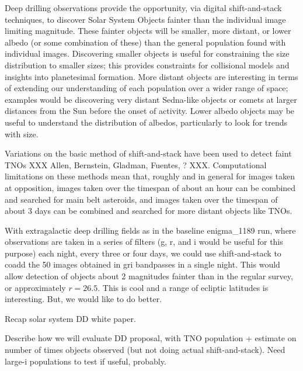 Deep drilling observations provide the opportunity, via digital
shift-and-stack techniques, to discover Solar System Objects fainter
than the individual image limiting magnitude. These fainter objects
will be smaller, more distant, or lower albedo (or some combination of these)
than the general population found with individual images. Discovering smaller
objects is useful for constraining the size distribution to smaller
sizes; this provides constraints for collisional models and insights
into planetesimal formation. More distant objects are interesting in
terms of extending our understanding of each population over a wider
range of space; examples would be discovering very distant
Sedna-like objects or comets at larger distances from the Sun before
the onset of activity. Lower albedo objects may be useful to
understand the distribution of albedos, particularly to look for
trends with size.

Variations on the basic method of shift-and-stack have been used to
detect faint TNOs XXX Allen, Bernstein, Gladman, Fuentes, ?
XXX. Computational limitations on these methods mean that, roughly
and in general for images taken at opposition, images taken over the timespan of about an hour can be
combined and searched for main belt asteroids, and images taken over
the timespan of about 3 days can be combined and searched for more
distant objects like TNOs.

With extragalactic deep drilling fields as in the baseline enigma\_1189
run, where observations are taken in a series of filters (g, r, and i
would be useful for this purpose) each night, every three or four
days, we could use shift-and-stack to coadd the 50 images obtained in
gri bandpasses in a single night. This would allow detection of
objects about 2 magnitudes fainter than in the regular survey, or
approximately $r=26.5$.  This is cool and a range of ecliptic
latitudes is interesting.  But, we would like to do better.

Recap solar system DD white paper.

Describe how we will evaluate DD proposal, with TNO population +
estimate on number of times objects observed (but not doing actual
shift-and-stack). Need large-i populations to test if useful, probably.


\navigationbar

